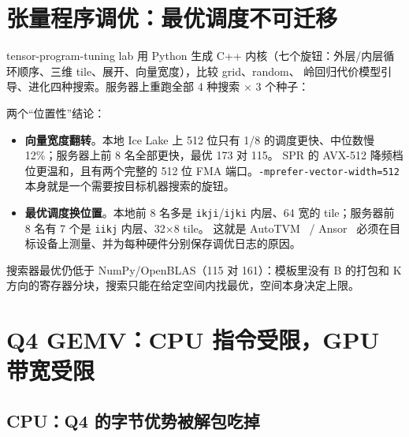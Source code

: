 \documentclass[11pt,a4paper]{ctexart}
\begin{document}
\section{张量程序调优：最优调度不可迁移}\label{sec:tuning}

tensor-program-tuning lab 用 Python 生成 C++ 内核（七个旋钮：外层/内层循环顺序、三维 tile、展开、向量宽度），比较 grid、random、
岭回归代价模型引导、进化四种搜索。服务器上重跑全部 4 种搜索 × 3 个种子：

\begin{table}[H]
\centering\small
\caption{同一搜索空间在两台机器上的结果（GFLOP/s，单线程）}\label{tab:tune}
\end{table}

两个“位置性”结论：
\begin{itemize}
  \item \textbf{向量宽度翻转}。本地 Ice Lake 上 512 位只有 1/8 的调度更快、中位数慢 12\%；服务器上前 8 名全部更快，最优 173 对 115。
        SPR 的 AVX-512 降频档位更温和，且有两个完整的 512 位 FMA 端口。\texttt{-mprefer-vector-width=512} 本身就是一个需要按目标机器搜索的旋钮。
  \item \textbf{最优调度换位置}。本地前 8 名多是 \texttt{ikji}/\texttt{ijki} 内层、64 宽的 tile；服务器前 8 名有 7 个是 \texttt{iikj} 内层、32×8 tile。
        这就是 AutoTVM~\cite{autotvm} / Ansor~\cite{ansor} 必须在目标设备上测量、并为每种硬件分别保存调优日志的原因。
\end{itemize}
搜索器最优仍低于 NumPy/OpenBLAS（115 对 161）：模板里没有 B 的打包和 K 方向的寄存器分块，搜索只能在给定空间内找最优，空间本身决定上限。

\section{Q4 GEMV：CPU 指令受限，GPU 带宽受限}\label{sec:gemv}

\subsection{CPU：Q4 的字节优势被解包吃掉}
\end{document}
